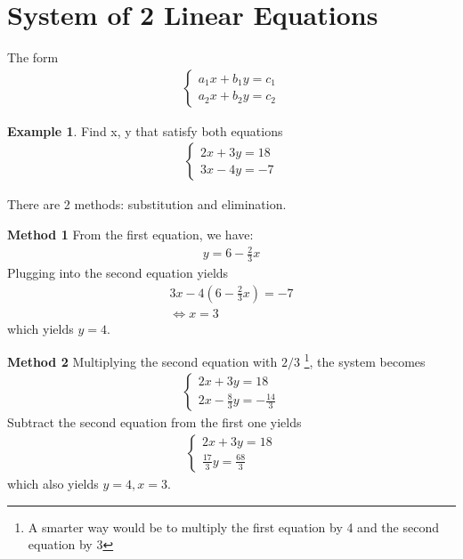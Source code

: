 \documentclass[10pt,a4paper]{book}
\theoremstyle{definition}\newtheorem{definition}{Definition}
\theoremstyle{definition}\newtheorem{fact}{Fact}
\theoremstyle{definition}\newtheorem{ex}{Ex.}
\theoremstyle{definition}\newtheorem{project}{Project}
\theoremstyle{definition}\newtheorem{problem}{Problem}
\theoremstyle{definition}\newtheorem{example}{Example}
\numberwithin{theorem}{chapter}
\numberwithin{corollary}{chapter}
\numberwithin{assumption}{chapter}
\numberwithin{definition}{chapter}
\numberwithin{prop}{chapter}
\numberwithin{notation}{chapter}
\numberwithin{problem}{chapter}
\numberwithin{example}{chapter}
\numberwithin{fact}{chapter}
\numberwithin{ex}{chapter}
\begin{document}
	\section{System of 2 Linear Equations}
	The form
	\begin{align*}
		\begin{cases}       
			a_1 x + b_1 y = c_1 \\
			a_2 x + b_2 y = c_2 
		\end{cases}         
	\end{align*}
	
	\begin{example}
		Find x, y that satisfy both equations
		\begin{align*}
			\begin{cases} 
				2x + 3y = 18  \\
				3x - 4y = -7  
			\end{cases}   
		\end{align*}
	\end{example}
	
	There are 2 methods: substitution and elimination.
	
	\textbf{Method 1}
	From the first equation, we have:
	\begin{align*}
		y = 6 - \frac{2}{3}x 
	\end{align*}
	Plugging into the second equation yields
	\begin{align*}
		3x - 4 \left( 6 - \frac{2}{3}x \right) = -7 \\
		\Leftrightarrow x = 3                       
	\end{align*}
	which yields $y=4$.
	
	\textbf{Method 2}
	Multiplying the second equation with $2/3$ \footnote{A smarter way would be to multiply the first equation by 4 and the second equation by 3}, the system becomes
	\begin{align*}
		\begin{cases}                     
			2x + 3y = 18                      \\
			2x - \frac{8}{3}y = -\frac{14}{3} 
		\end{cases}                       
	\end{align*}
	Subtract the second equation from the first one yields
	\begin{align*}
		\begin{cases}                
			2x + 3y = 18                 \\
			\frac{17}{3}y = \frac{68}{3} 
		\end{cases}                  
	\end{align*}
	which also yields $y=4, x=3$.
	
\end{document}
